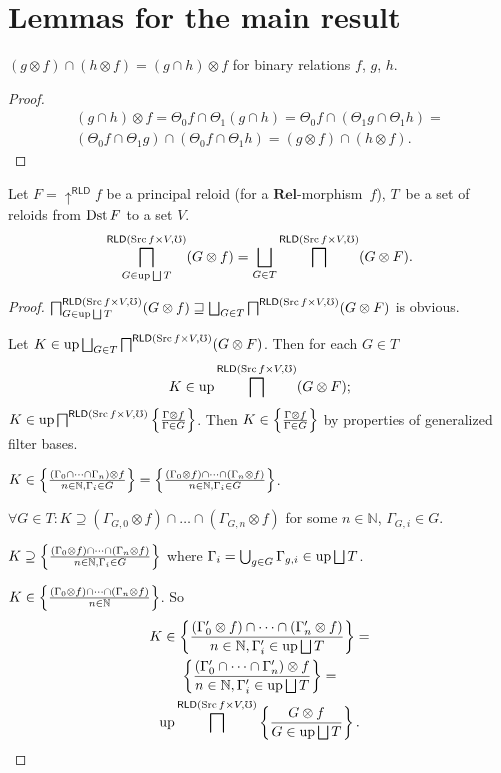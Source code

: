 \section{Lemmas for the main result}
\begin{lem}
$(g\otimes f)\cap(h\otimes f)=(g\cap h)\otimes f$ for binary relations
$f$, $g$, $h$.\end{lem}
\begin{proof}
~
\begin{multline*}
(g\cap h)\otimes f=\Theta_{0}f\cap\Theta_{1}(g\cap h)=\Theta_{0}f\cap(\Theta_{1}g\cap\Theta_{1}h)=\\
(\Theta_{0}f\cap\Theta_{1}g)\cap(\Theta_{0}f\cap\Theta_{1}h)=(g\otimes f)\cap(h\otimes f).
\end{multline*}
\end{proof}
\begin{lem}
Let $F=\uparrow^{\mathsf{RLD}}f$ be a principal reloid (for a $\mathbf{Rel}$-morphism~$f$),
$T$~be a set of reloids from $\operatorname{Dst} F$ to a set $V$.
\[
\bigsqcap_{G\in\up\bigsqcup T}^{\mathsf{RLD}(\Src f\times V,\mho)}(G\otimes f)=\bigsqcup_{G\in T}\bigsqcap^{\mathsf{RLD}(\Src f\times V,\mho)}(G\otimes F).
\]
\end{lem}
\begin{proof}
$\bigsqcap_{G\in\up\bigsqcup T}^{\mathsf{RLD}(\Src f\times V,\mho)}(G\otimes f)\sqsupseteq\bigsqcup_{G\in T}\bigsqcap^{\mathsf{RLD}(\Src f\times V,\mho)}(G\otimes F)$
is obvious.

Let $K\in\up\bigsqcup_{G\in T}\bigsqcap^{\mathsf{RLD}(\Src f\times V,\mho)}(G\otimes F)$.
Then for each $G\in T$
\[
K\in\operatorname{up}\bigsqcap^{\mathsf{RLD}(\operatorname{Src} f\times V,\mho)}(G\otimes F);
\]
$K\in\operatorname{up}\bigsqcap^{\mathsf{RLD}(\operatorname{Src} f\times V,\mho)}\left\{ \frac{\Gamma\otimes f}{\Gamma\in G}\right\}$.
Then $K\in\left\{ \frac{\Gamma\otimes f}{\Gamma\in G}\right\}$ by properties of
generalized filter bases.

$K\in\left\{ \frac{(\Gamma_{0}\cap\dots\cap\Gamma_{n})\otimes f}{n\in\mathbb{N},\Gamma_{i}\in G}\right\}=\left\{ \frac{(\Gamma_{0}\otimes f)\cap\dots\cap(\Gamma_{n}\otimes f)}{n\in\mathbb{N},\Gamma_{i}\in G}\right\}$.

$\forall G\in T:K\supseteq(\Gamma_{G,0}\otimes f)\cap\dots\cap(\Gamma_{G,n}\otimes f)$
for some $n\in\mathbb{N}$, $\Gamma_{G,i}\in G$.

$K\supseteq\left\{ \frac{(\Gamma_{0}\otimes f)\cap\dots\cap(\Gamma_{n}\otimes f)}{n\in\mathbb{N},\Gamma_{i}\in G}\right\}$
where $\Gamma_{i}=\bigcup_{g\in G}\Gamma_{g,i}\in\up\bigsqcup T$.

$K\in\left\{ \frac{(\Gamma_{0}\otimes f)\cap\dots\cap(\Gamma_{n}\otimes f)}{n\in\mathbb{N}}\right\}$.
So
\begin{multline*}
K\in\setcond{(\Gamma'_{0}\otimes f)\cap\dots\cap(\Gamma'_{n}\otimes f)}{n\in\mathbb{N},\Gamma'_{i}\in\up\bigsqcup T}=\\
\setcond{(\Gamma'_{0}\cap\dots\cap\Gamma'_{n})\otimes f}{n\in\mathbb{N},\Gamma'_{i}\in\up\bigsqcup T}=\\
\up\bigsqcap^{\mathsf{RLD}(\Src f\times V,\mho)}\setcond{G\otimes f}{G\in\up\bigsqcup T}.
\end{multline*}

\end{proof}

